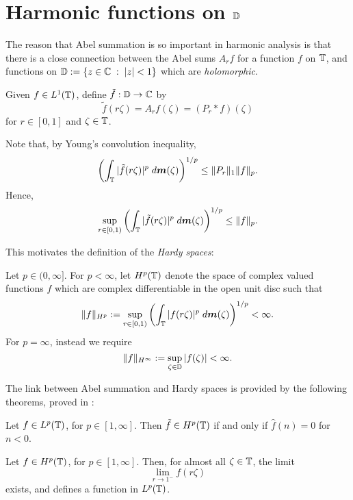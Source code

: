 \section{Harmonic functions on $\mathbb{D}$}
The reason that Abel summation is so important in harmonic analysis
 is that there is a close connection between the Abel sums $A_r f$
for a function $f$ on $\mathbb{T}$, and functions on $\mathbb{D} := \{ z \in \mathbb{C}\;:\; |z| < 1\}$
which are \emph{holomorphic}.

Given $f \in L^1(\mathbb{T})$, define $\tilde{f}:\mathbb{D}\rightarrow\mathbb{C}$
by
\begin{equation*}
    \tilde{f}(r\zeta) = A_rf(\zeta) = (P_r*f)(\zeta)
\end{equation*}
for $r \in [0,1]$ and $\zeta \in \mathbb{T}$.

Note that, by Young's convolution inequality,
\begin{equation*}
    \left(\int_{\mathbb{T}} |\tilde{f}(r\zeta)|^p\;d\boldsymbol{m}(\zeta)\right)^{1/p} \leq \|P_r\|_1 \|f\|_{p}.
\end{equation*}
Hence,
\begin{equation*}
    \sup_{r \in [0,1)} \left(\int_{\mathbb{T}} |\tilde{f}(r\zeta)|^p\;d\boldsymbol{m}(\zeta)\right)^{1/p} \leq \|f\|_p.
\end{equation*} 

This motivates the definition of the \emph{Hardy spaces}:
\begin{definition}
    Let $p \in (0,\infty]$. For $p < \infty$, let $H^p(\mathbb{T})$ denote the space
    of complex valued functions $f$ which are complex differentiable in the open unit disc
    such that
    \begin{equation}
        \|f\|_{H^p} := \sup_{r \in [0,1)} \left(\int_{\mathbb{T}} |f(r\zeta)|^p \;d\boldsymbol{m}(\zeta)\right)^{1/p} < \infty.
    \end{equation}
    For $p = \infty$, instead we require
    \begin{equation*}
        \|f\|_{H^\infty} := \sup_{\zeta \in \mathbb{D}} |f(\zeta)| < \infty.
    \end{equation*}
\end{definition}

The link between Abel summation and Hardy spaces is provided by the following theorems,
proved in \cite{katznelson}:
\begin{theorem}
\label{hardyProjection1}
    Let $f \in L^p(\mathbb{T})$, for $p \in [1,\infty]$. Then $\tilde{f} \in H^p(\mathbb{T})$
    if and only if $\hat{f}(n) = 0$ for $n < 0$.
\end{theorem}
\begin{theorem}
\label{hardyProjection2}
    Let $f \in H^p(\mathbb{T})$, for $p \in [1,\infty]$. Then, for almost all $\zeta \in \mathbb{T}$,
    the limit
    \begin{equation*}
        \lim_{r\to 1^-} f(r\zeta)
    \end{equation*}
    exists, and defines a function in $L^p(\mathbb{T})$.
\end{theorem}

